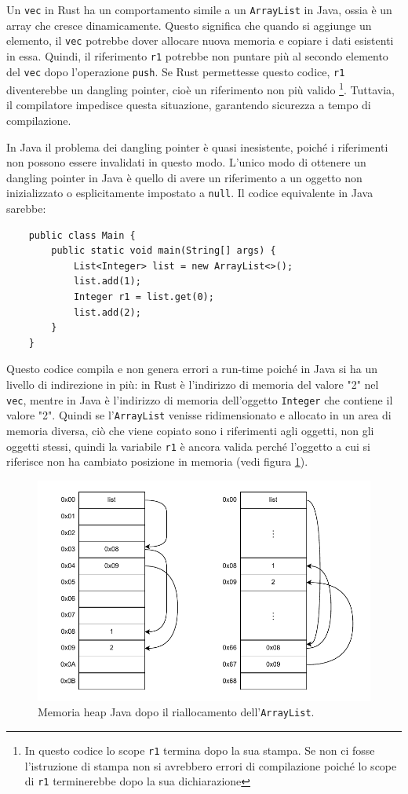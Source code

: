 Un \texttt{vec} in Rust ha un comportamento simile a un \texttt{ArrayList} in Java, ossia è un array che cresce dinamicamente. Questo significa che quando si aggiunge un elemento, il \texttt{vec} potrebbe dover allocare nuova memoria e copiare i dati esistenti in essa. Quindi, il riferimento \texttt{r1} potrebbe non puntare più al secondo elemento del \texttt{vec} dopo l'operazione \texttt{push}. Se Rust permettesse questo codice, \texttt{r1} diventerebbe un dangling pointer, cioè un riferimento non più valido
\footnote{In questo codice lo scope \texttt{r1} termina dopo la sua stampa. Se non ci fosse l'istruzione di stampa non si avrebbero errori di compilazione poiché lo scope di \texttt{r1} terminerebbe dopo la sua dichiarazione}.
 Tuttavia, il compilatore impedisce questa situazione, garantendo sicurezza a tempo di compilazione.

In Java il problema dei dangling pointer è quasi inesistente, poiché i riferimenti non possono essere invalidati in questo modo. L'unico modo di ottenere un dangling pointer in Java è quello di avere un riferimento a un oggetto non inizializzato o esplicitamente impostato a \texttt{null}. Il codice equivalente in Java sarebbe:
\begin{verbatim}
    public class Main {
        public static void main(String[] args) {
            List<Integer> list = new ArrayList<>();
            list.add(1);
            Integer r1 = list.get(0);
            list.add(2);
        }
    }
\end{verbatim}
Questo codice compila e non genera errori a run-time poiché in Java si ha un livello di indirezione in più:  in Rust è l'indirizzo di memoria del valore "2" nel \texttt{vec}, mentre in Java è l'indirizzo di memoria dell'oggetto \texttt{Integer} che contiene il valore "2". Quindi se l'\texttt{ArrayList} venisse ridimensionato e allocato in un area di memoria diversa, ciò che viene copiato sono i riferimenti agli oggetti, non gli oggetti stessi, quindi la variabile \texttt{r1} è ancora valida perché l'oggetto a cui si riferisce non ha cambiato posizione in memoria (vedi figura \ref{fig:bor3}). 
\begin{figure}[H]
    \centering
    \includegraphics[width = \textwidth]{Figures/bor3.drawio.pdf}
    \caption{Memoria heap Java dopo il riallocamento dell'\texttt{ArrayList}.}
    \label{fig:bor3}
\end{figure}
